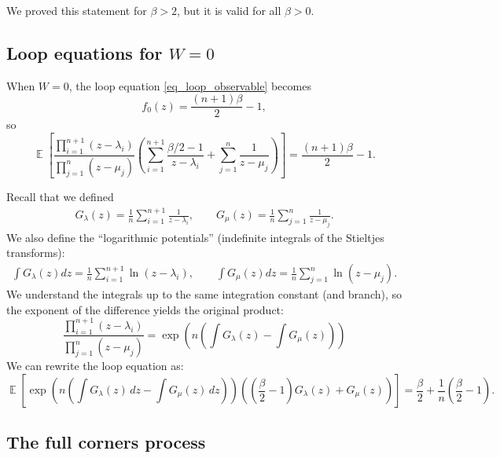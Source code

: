 \documentclass[letterpaper,11pt,oneside,reqno]{article}
\numberwithin{equation}{section}
\theoremstyle{definition}
\begin{document}
We proved this statement for $\beta>2$, but it is valid for all $\beta>0$.

\subsection{Loop equations for $W=0$}

When $W=0$, the loop equation \eqref{eq_loop_observable} becomes
\begin{equation*}
	f_0(z)=\frac{(n+1)\beta}{2}-1,
\end{equation*}
so
\begin{equation*}
		\operatorname{\mathbb{E}}\left[\frac{\prod_{i=1}^{n+1}(z-\lambda_i)}{\prod_{j=1}^n(z-\mu_j)}\left(\sum_{i=1}^{n+1}\frac{\beta/2-1}{z-\lambda_i} + \sum_{j=1}^n\frac{1}{z-\mu_j}\right)\right] = \frac{(n+1)\beta}{2}-1.
\end{equation*}

Recall that we defined
\begin{align*}
G_\lambda(z) = \frac{1}{n}\sum_{i=1}^{n+1}\frac{1}{z-\lambda_i},
\qquad
G_\mu(z) = \frac{1}{n}\sum_{j=1}^n\frac{1}{z-\mu_j}.
\end{align*}
We also define the ``logarithmic potentials'' (indefinite integrals of the Stieltjes transforms):
\begin{align*}
\int G_\lambda(z)dz = \frac{1}{n}\sum_{i=1}^{n+1}\ln(z-\lambda_i), \qquad
\int G_\mu(z)dz = \frac{1}{n}\sum_{j=1}^n\ln(z-\mu_j).
\end{align*}
We understand the integrals up to the same integration constant (and branch), so the exponent of the difference
yields the original product:
\begin{equation*}
	\frac{\prod_{i=1}^{n+1}(z-\lambda_i)}{\prod_{j=1}^n(z-\mu_j)} = \exp\left(n\left(\int G_\lambda(z) - \int G_\mu(z)\right)\right)
\end{equation*}
We can rewrite
the loop equation
as:
\begin{equation} \label{eq:stieltjes_transform_eq}
	\operatorname{\mathbb{E}}\left[\exp\left(n\left(\int G_\lambda(z)\,dz - \int G_\mu(z)\,dz\right)\right)\left(\left(\frac{\beta}{2}-1\right)G_\lambda(z) + G_\mu(z)\right)\right] = \frac{\beta}{2} + \frac{1}{n}\left(\frac{\beta}{2}-1\right).
\end{equation}

\subsection{The full corners process}
\end{document}
